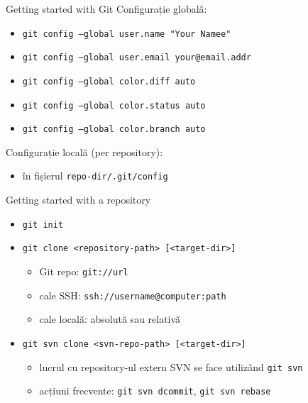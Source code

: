 \documentclass{beamer}
\begin{document}
\begin{frame}{Getting started with Git}
Configurație globală:
\begin{itemize} %
\item \texttt{git config --global user.name "Your Namee"}
\item \texttt{git config --global user.email your@email.addr}
\\
\item \texttt{git config --global color.diff auto}
\item \texttt{git config --global color.status auto}
\item \texttt{git config --global color.branch auto}
\end{itemize}
Configurație locală (per repository):
\begin{itemize} %
\item în fișierul \texttt{repo-dir/.git/config}
\end{itemize}
\end{frame}

\begin{frame}{Getting started with a repository}
\begin{itemize} %
\item \texttt{git init}
\pause\item \texttt{git clone <repository-path> [<target-dir>]}
\begin{itemize}
	\item Git repo: \texttt{git://url}
	\item cale SSH: \texttt{ssh://username@computer:path}
	\item cale locală: absolută sau relativă
\end{itemize}
\pause\item \texttt{git svn clone <svn-repo-path> [<target-dir>]}
\begin{itemize}
	\item lucrul cu repository-ul extern SVN se face utilizând \texttt{git svn}
	\item acțiuni frecvente: \texttt{git svn dcommit}, \texttt{git svn rebase}
\end{itemize}
\end{itemize}
\end{frame}
\end{document}
